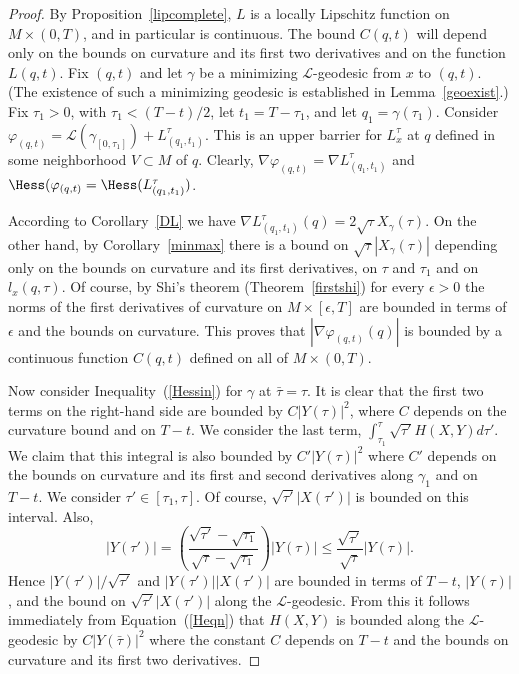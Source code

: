 \begin{proof}\sketch
{}
By Proposition~\ref{lipcomplete}, $L$ is a locally Lipschitz
function on $M\times (0,T)$, and in particular is continuous. The
bound $C(q,t)$ will depend only on the bounds on curvature and its
first two derivatives and on the function $L(q,t)$. Fix $(q,t)$ and
let $\gamma$ be a minimizing ${\mathcal L}$-geodesic from $x$ to
$(q,t)$. (The existence of such a minimizing geodesic is established
in Lemma~\ref{geoexist}.) Fix $\tau_1>0$, with $\tau_1<(T-t)/2$, let
$t_1=T-\tau_1$, and let $q_1=\gamma(\tau_1)$. Consider
$\varphi_{(q,t)}={\mathcal L}(\gamma_{[0,\tau_1]})+
L^\tau_{(q_1,t_1)}$. This is an upper barrier  for $L_x^\tau$ at $q$
defined in some neighborhood $V\subset M$ of $q$.  Clearly, $\nabla
\varphi_{(q,t)}=\nabla L^\tau_{(q_1,t_1)}$ and $\Hess(\varphi_{(q,t)}=\Hess( L^\tau_{(q_1,t_1)})$.



According to Corollary~\ref{DL} we have $\nabla
L^\tau_{(q_1,t_1)}(q)=2\sqrt{\tau}X_{\gamma}(\tau)$. On the other
hand, by Corollary~\ref{minmax} there is a bound on
$\sqrt{\tau}|X_{\gamma}(\tau)|$ depending only on the bounds on
curvature and its first derivatives, on $\tau$ and $\tau_1$ and on
$l_x(q,\tau)$. Of course, by Shi's theorem (Theorem~\ref{firstshi})
for every $\epsilon>0$ the norms of the first derivatives of
curvature on $M\times [\epsilon,T]$ are bounded in terms of
$\epsilon$ and the bounds on curvature.
 This
proves that $|\nabla \varphi_{(q,t)}(q)|$ is bounded by a continuous
function $C(q,t)$ defined on all of $M\times (0,T)$.

 Now consider Inequality~(\ref{Hessin}) for $\gamma$ at $\bar\tau=\tau$.
 It is clear that the first
 two terms on the right-hand side are bounded by $C|Y(\tau)|^2$,
 where $C$ depends on the curvature bound and on $T-t$. We consider
 the last term, $\int_{\tau_1}^{\tau}\sqrt{\tau'}H(X,Y)d\tau'$.
 We claim that this integral is also bounded by $C'|Y(\tau)|^2$
 where $C'$ depends on the bounds on curvature and its first and
 second derivatives along $\gamma_1$ and on $T-t$.
We consider $\tau'\in [\tau_1,\tau]$. Of course,
 $\sqrt{\tau'}|X(\tau')|$ is bounded on this interval. Also,
 $$|Y(\tau')|=\left(\frac{\sqrt{\tau'}-\sqrt{\tau_1}}{\sqrt{\tau}
 -\sqrt{\tau_1}}\right)|Y(\tau)|\le \frac{\sqrt{\tau'}}{\sqrt{\tau}}|Y(\tau)|.$$
Hence $|Y(\tau')|/\sqrt{\tau'}$ and $|Y(\tau')||X(\tau')|$ are
bounded in terms of $T-t$, $|Y(\tau)|$, and the bound on
$\sqrt{\tau'}|X(\tau')|$ along the ${\mathcal L}$-geodesic. From
this it follows immediately from Equation~(\ref{Heqn}) that $H(X,Y)$
is bounded along the ${\mathcal L}$-geodesic  by $C|Y(\bar\tau)|^2$
 where the constant $C$ depends on $T-t$ and the
 bounds on curvature and its first two derivatives.
\end{proof}

